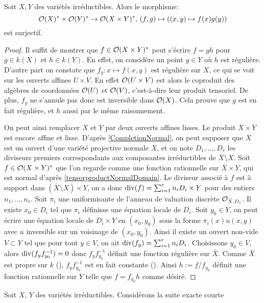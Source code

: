 \begin{prop}
Soit $X, Y$ des variétés irréductibles. Alors le morphisme:
$$\mathcal{O}(X)^*\times\mathcal{O}(Y)^*\rightarrow\mathcal{O}(X\times Y)^*,\,(f,g)\mapsto ((x,y )\mapsto f(x)g(y))$$
est surjectif.
\end{prop}
\begin{proof}
Il suffit de montrer que $f\in \mathcal{O}(X\times Y)^*$ peut s'écrire $f=gh$ pour $g\in k(X)$ et $h\in k(Y)$. En effet, on considère un point $y\in Y$ où $h$ est régulière. D'autre part on constate que $f_y:x\mapsto f(x,y)$ est régulière sur $X$, ce qui se voit sur les ouverts affines $U\times V$. En effet $\mathcal{O}(U\times V)$ est alors le coproduit des algèbres de coordonnées $\mathcal{O}(U)$ et $\mathcal{O}(V)$, c'est-à-dire leur produit tensoriel. De plus, $f_y$ ne s'annule pas donc est inversible dans $\mathcal{O}(X)$. Cela prouve que $g$ est en fait régulière, et $h$ aussi par le même raisonnement.

On peut ainsi remplacer $X$ et $Y$ par deux ouverts affines lisses. Le produit  $X\times Y$ est encore affine et lisse. D'après \ref{CompletionNormal}, on peut supposer que $X$ est un ouvert d'une variété projective normale $\bar{X}$, et on note $D_1,...,D_r$ les diviseurs premiers correspondants aux composantes irréductibles de $\bar{X}\setminus X$. Soit $f\in \mathcal{O}(X\times Y)^*$ que l'on regarde comme une fonction rationnelle sur $\bar{X}\times Y$, qui est normal d'après \ref{tensorproductNormalDomain}. Le diviseur associé à $f$ est à support dans $(\bar{X}\setminus X)\times Y$, on a donc $\operatorname{div}(f)=\sum_{i=1}^rn_iD_i\times Y$ pour des entiers $n_1,...,n_r$. Soit $\pi_i$ une uniformisante de l'anneau de valuation discrète $\mathcal{O}_{\bar{X},D_i}$. Il existe $x_0\in D_i$ tel que $\pi_i$ définisse une équation locale de $D_i$. Soit $y_0\in Y$, on peut écrire une équation locale de $D_i\times Y$ en $(x_0,y_0)$ sous la forme $\pi_i(x)u(x,y)$ avec $u$ inversible sur un voisinage de $(x_0,y_0)$. Ainsi il existe un ouvert non-vide $V\subset Y$ tel que pour tout $y\in V$, on ait $\operatorname{div}(f_y)=\sum_{i=1}^rn_iD_i$. Choisissons $y_0\in V$, alors $\operatorname{div}(f_yf_{y_0}^{-1})=0$ donc $f_yf_{y_0}^{-1}$ définit une fonction régulière sur $\bar{X}$. Comme $\bar{X}$ est propre sur $k$ (\cite[II.4.9]{Hartshorne}), $f_yf_{y_0}^{-1}$ est en fait constante (\cite[ex II.4.4]{Hartshorne}). Ainsi $h:=f/f_{y_0}$ définit une fonction rationnelle sur $Y$ telle que $f=f_{y_0}h$ comme désiré.
\end{proof}

\noindent Soit $X,\,Y$ des variétés irréductibles. Considérons la suite exacte courte


